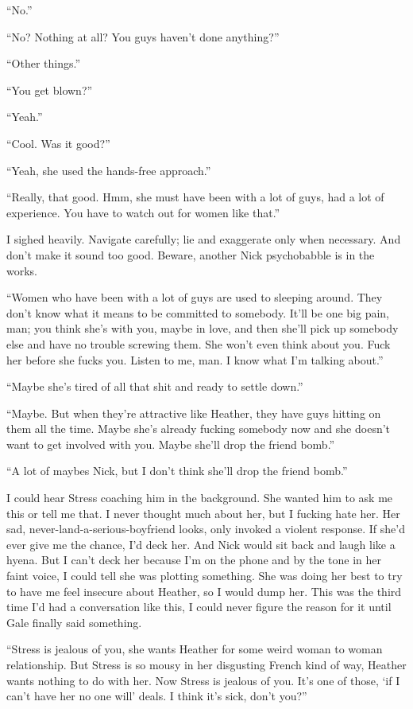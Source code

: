``No.''

``No? Nothing at all? You guys haven't done anything?''

``Other things.''

``You get blown?''

``Yeah.''

``Cool. Was it good?''

``Yeah, she used the hands-free approach.''

``Really, that good. Hmm, she must have been with a lot of guys, had a
lot of experience. You have to watch out for women like that.''

I sighed heavily. Navigate carefully; lie and exaggerate only when
necessary. And don't make it sound too good. Beware, another Nick
psychobabble is in the works.

``Women who have been with a lot of guys are used to sleeping around.
They don't know what it means to be committed to somebody. It'll be one
big pain, man; you think she's with you, maybe in love, and then she'll
pick up somebody else and have no trouble screwing them. She won't even
think about you. Fuck her before she fucks you. Listen to me, man. I
know what I'm talking about.''

``Maybe she's tired of all that shit and ready to settle down.''

``Maybe. But when they're attractive like Heather, they have guys
hitting on them all the time. Maybe she's already fucking somebody now
and she doesn't want to get involved with you. Maybe she'll drop the
friend bomb.''

``A lot of maybes Nick, but I don't think she'll drop the friend bomb.''

I could hear Stress coaching him in the background. She wanted him to
ask me this or tell me that. I never thought much about her, but I
fucking hate her. Her sad, never-land-a-serious-boyfriend looks, only
invoked a violent response. If she'd ever give me the chance, I'd deck
her. And Nick would sit back and laugh like a hyena. But I can't deck
her because I'm on the phone and by the tone in her faint voice, I could
tell she was plotting something. She was doing her best to try to have
me feel insecure about Heather, so I would dump her. This was the third
time I'd had a conversation like this, I could never figure the reason
for it until Gale finally said something.

``Stress is jealous of you, she wants Heather for some weird woman to
woman relationship. But Stress is so mousy in her disgusting French kind
of way, Heather wants nothing to do with her. Now Stress is jealous of
you. It's one of those, `if I can't have her no one will' deals. I think
it's sick, don't you?''

